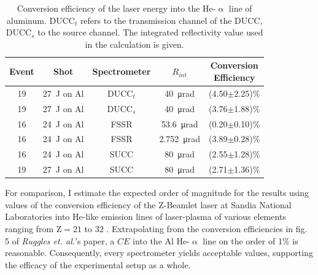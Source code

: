 \begin{table}[H]
	\centering
	\caption{Conversion efficiency of the laser energy into the He-$\upalpha$ line of aluminum. DUCC$_t$ refers to the transmission channel of the DUCC, DUCC$_s$ to the source channel. The integrated reflectivity value used in the calculation is given.}
	\vspace{0.05cm}
	\renewcommand{\arraystretch}{1.5}
	\centering
	\begin{tabular}{|c|c|c|c|c|} 
		\hline
		Event & Shot & Spectrometer & $R_{int}$ & \makecell{Conversion \\ Efficiency} \\ 
		[0.5ex]
		\hline\hline
		19 & \SI{27}{\joule} on Al & DUCC$_t$ & \SI{40}{\micro\radian} & (4.50$\pm$2.25)\% \\ 
		[0.5ex]
		\hline
		19 & \SI{27}{\joule} on Al & DUCC$_s$ & \SI{40}{\micro\radian} & (3.76$\pm$1.88)\% \\ 
		[0.5ex]
		\hline
		16 & \SI{24}{\joule} on Al & FSSR & \SI{53.6}{\micro\radian} & (0.20$\pm$0.10)\% \\ 
		[0.5ex]
		\hline
		16 & \SI{24}{\joule} on Al & FSSR & \SI{2.752}{\micro\radian} & (3.89$\pm$0.28)\% \\ 
		[0.5ex]
		\hline
		16 & \SI{24}{\joule} on Al & SUCC & \SI{80}{\micro\radian} & (2.55$\pm$1.28)\% \\ 
		[0.5ex]
		\hline
		19 & \SI{27}{\joule} on Al & SUCC & \SI{80}{\micro\radian} & (2.71$\pm$1.36)\% \\ 
		[0.5ex]
		\hline
	\end{tabular}
	\label{Table: CE}
\end{table}

For comparison, I estimate the expected order of magnitude for the results using values of the conversion efficiency of the Z-Beamlet laser at Sandia National Laboratories into He-like emission lines of laser-plasma of various elements ranging from Z$=21$ to 32 \citep{ruggles2003measurements}. Extrapolating from the conversion efficiencies in fig. 5 of \textit{Ruggles et. al.}'s paper, a $CE$ into the Al He-$\upalpha$ line on the order of 1\% is reasonable. Consequently, every spectrometer yields acceptable values, supporting the efficacy of the experimental setup as a whole.

